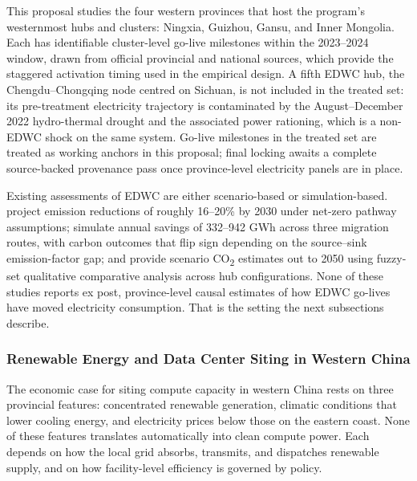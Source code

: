 \documentclass[12pt,a4paper]{article}
\begin{document}
This proposal studies the four western provinces that host the
program's westernmost hubs and clusters: Ningxia, Guizhou, Gansu, and
Inner Mongolia. Each has identifiable cluster-level go-live milestones
within the 2023--2024 window, drawn from official provincial and
national sources, which provide the staggered activation timing used
in the empirical design. A fifth EDWC hub, the Chengdu--Chongqing node
centred on Sichuan, is not included in the treated set: its
pre-treatment electricity trajectory is contaminated by the
August--December 2022 hydro-thermal drought and the associated power
rationing, which is a non-EDWC shock on the same system. Go-live
milestones in the treated set are treated as working anchors in this
proposal; final locking awaits a complete source-backed provenance
pass once province-level electricity panels are in place.

Existing assessments of EDWC are either scenario-based or simulation-based.
\citet{zhangetal-2025-easterndatawestern} project emission reductions of
roughly 16--20\% by 2030 under net-zero pathway assumptions;
\citet{zhangetal-2025-decarbonizingdatacenters} simulate annual savings
of 332--942 GWh across three migration routes, with carbon outcomes
that flip sign depending on the source--sink emission-factor gap; and
\citet{xieetal-2024-greeningchinasdigital} provide scenario CO\textsubscript{2}
estimates out to 2050 using fuzzy-set qualitative comparative analysis
across hub configurations. None of these studies reports ex post,
province-level causal estimates of how EDWC go-lives have moved
electricity consumption. That is the setting the next subsections
describe.


\subsubsection{Renewable Energy and Data Center Siting in Western China}
%
%

The economic case for siting compute capacity in western China rests
on three provincial features: concentrated renewable generation,
climatic conditions that lower cooling energy, and electricity prices
below those on the eastern coast. None of these features translates
automatically into clean compute power. Each depends on how the local
grid absorbs, transmits, and dispatches renewable supply, and on how
facility-level efficiency is governed by policy.
\end{document}
